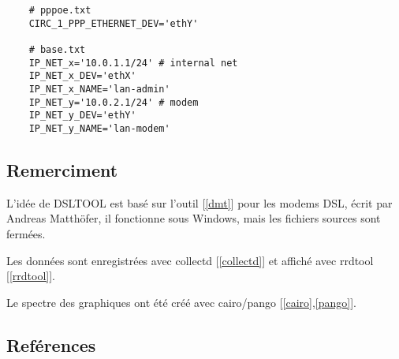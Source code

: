 
\begin{example}
\begin{verbatim}
    # pppoe.txt
    CIRC_1_PPP_ETHERNET_DEV='ethY'

    # base.txt
    IP_NET_x='10.0.1.1/24' # internal net
    IP_NET_x_DEV='ethX'
    IP_NET_x_NAME='lan-admin'
    IP_NET_y='10.0.2.1/24' # modem 
    IP_NET_y_DEV='ethY'
    IP_NET_y_NAME='lan-modem'
\end{verbatim}
\end{example}

\subsection{Remerciment}

  L'idée de DSLTOOL est basé sur l'outil {[\ref{dmt}]} pour les modems DSL,
  écrit par Andreas Matthöfer, il fonctionne sous Windows, mais les fichiers
  sources sont fermées.

  Les données sont enregistrées avec collectd {[\ref{collectd}]} et affiché
  avec rrdtool {[\ref{rrdtool}]}.

  Le spectre des graphiques ont été créé avec cairo/pango {[\ref{cairo},\ref{pango}]}.

\subsection{Reférences}

\begin{list}{\textbf{[]}}{}

  \item \label{wiki}

  \item \label{dmt}

  \item \label{collectd}

  \item \label{rrdtool}

  \item \label{cairo}

  \item \label{pango}

\end{list}
